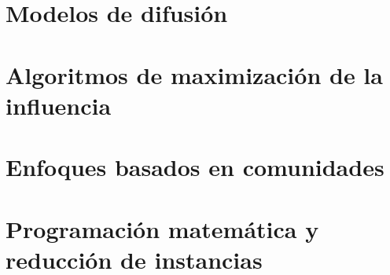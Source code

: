 \documentclass[12pt,twoside,titlepage]{report}
\begin{document}
\section{Modelos de difusión} \label{sec:lit_difusion}


\section{Algoritmos de maximización de la influencia} \label{sec:lit_algoritmos}


\section{Enfoques basados en comunidades} \label{sec:lit_comunidades}


\section{Programación matemática y reducción de instancias} \label{sec:lit_ilp}
\end{document}
